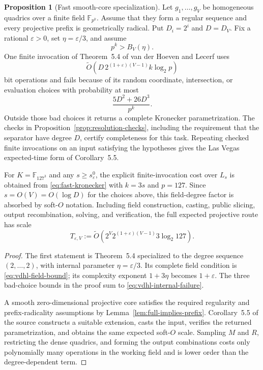 \documentclass[11pt,a4paper]{article}
\theoremstyle{definition}
\newtheorem{proposition}[theorem]{Proposition}
\theoremstyle{remark}
\newcommand{\F}{\mathbb F}
\begin{document}
\begin{proposition}[Fast smooth-core specialization]\label{prop:finite-field-kronecker}
Let $g_1,\ldots,g_V$ be homogeneous quadrics over a finite field $\F_{p^k}$.  Assume that they form a regular sequence and every projective prefix is geometrically radical.  Put $D_i=2^i$ and $D=D_V$.  Fix a rational $\varepsilon>0$, set $\eta=\varepsilon/3$, and assume
\[
 p^k>B_V(\eta).
\]
One finite invocation of Theorem~5.4 of van der Hoeven and Lecerf uses
\begin{equation}\label{eq:fast-kronecker}
 \widetilde O\!\left(D\,2^{(1+\varepsilon)(V-1)}k\log_2p\right)
\end{equation}
bit operations and fails because of its random coordinate, intersection, or evaluation choices with probability at most
\begin{equation}\label{eq:vdhl-internal-failure}
 \frac{5D^2+26D^3}{p^k}.
\end{equation}
Outside those bad choices it returns a complete Kronecker parametrization.  The checks in Proposition~\ref{prop:resolution-checks}, including the requirement that the separator have degree $D$, certify completeness for this task.  Repeating checked finite invocations on an input satisfying the hypotheses gives the Las Vegas expected-time form of Corollary~5.5.

For $K=\F_{127^3}$ and any $s\ge s_\varepsilon^0$, the explicit finite-invocation cost over $L_s$ is obtained from \eqref{eq:fast-kronecker} with $k=3s$ and $p=127$.  Since $s=O(V)=O(\log D)$ for the choices above, this field-degree factor is absorbed by soft-$O$ notation.  Including field construction, casting, public slicing, output recombination, solving, and verification, the full expected projective route has scale
\begin{equation}\label{eq:fast-solver-scale}
 T_{\varepsilon,V}
 :=\widetilde O\!\left(
 2^V2^{(1+\varepsilon)(V-1)}3\log_2 127
 \right).
\end{equation}
\end{proposition}

\begin{proof}
The first statement is Theorem~5.4 specialized to the degree sequence $(2,\ldots,2)$, with internal parameter $\eta=\varepsilon/3$.  Its complete field condition is \eqref{eq:vdhl-field-bound}; its complexity exponent $1+3\eta$ becomes $1+\varepsilon$.  The three bad-choice bounds in the proof sum to \eqref{eq:vdhl-internal-failure}.

A smooth zero-dimensional projective core satisfies the required regularity and prefix-radicality assumptions by Lemma~\ref{lem:full-implies-prefix}.  Corollary~5.5 of the source constructs a suitable extension, casts the input, verifies the returned parametrization, and obtains the same expected soft-$O$ scale.  Sampling $M$ and $R$, restricting the dense quadrics, and forming the output combinations costs only polynomially many operations in the working field and is lower order than the degree-dependent term.
\end{proof}
\end{document}
